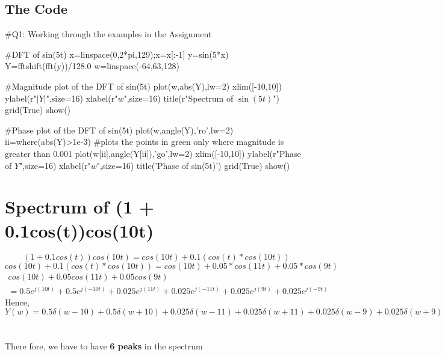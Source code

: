 \documentclass[11pt]{article}
\begin{document}
\subsection{The Code}
\begin{python}
#Q1: Working through the examples in the Assignment

#DFT of sin(5t)
x=linspace(0,2*pi,129);x=x[:-1]
y=sin(5*x)
Y=fftshift(fft(y))/128.0
w=linspace(-64,63,128)

#Magnitude plot of the DFT of sin(5t)
plot(w,abs(Y),lw=2)
xlim([-10,10])
ylabel(r"$|Y|$",size=16)
xlabel(r"$w$",size=16)
title(r"Spectrum of $\sin(5t)$")
grid(True)
show()

#Phase plot of the DFT of sin(5t)
plot(w,angle(Y),'ro',lw=2)
ii=where(abs(Y)>1e-3)				#plots the points in green only where magnitude is greater than 0.001
plot(w[ii],angle(Y[ii]),'go',lw=2)
xlim([-10,10])
ylabel(r"Phase of $Y$",size=16)
xlabel(r"$w$",size=16)
title('Phase of sin(5t)')
grid(True)
show()
\end{python}



\section{Spectrum of (1 + 0.1cos(t))cos(10t)}
\begin{equation}
    (1 + 0.1cos(t))cos(10t) = cos(10t) + 0.1(cos(t)*cos(10t))
\end{equation}
\begin{equation}
    cos(10t) + 0.1(cos(t)*cos(10t)) = cos(10t) + 0.05*cos(11t) + 0.05*cos(9t)
\end{equation}
\begin{equation}
\begin{array}{cc}
     cos(10t) + 0.05cos(11t) + 0.05cos(9t) &\\ = 0.5e^{j(10t)}+0.5e^{j(-10t)} +
     0.025e^{j(11t)}+0.025e^{j(-11t)} + 0.025e^{j(9t)}+0.025e^{j(-9t)}
\end{array}
\end{equation}
Hence,
\begin{equation}
    Y(w) = 0.5\delta (w-10) + 0.5\delta (w+10)+ 0.025\delta (w-11) + 0.025\delta (w+11)+ 0.025\delta (w-9) + 0.025\delta (w+9) 
\end{equation}
\\~\\
There fore, we have to have \textbf{6 peaks} in the spectrum
\end{document}
